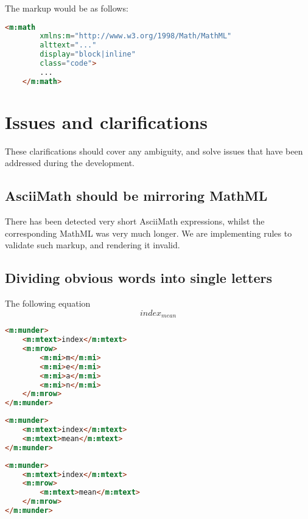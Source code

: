 \documentclass[english,a4paper,11pt]{article}
\begin{document}
\begin{eksempler}
The markup would be as follows:
\begin{lstlisting}[language=HTML]
	<m:math 
	    xmlns:m="http://www.w3.org/1998/Math/MathML"
	    alttext="..."
	    display="block|inline"
		class="code">
		...
	</m:math>
\end{lstlisting}
\end{eksempler}

\section{Issues and clarifications}

These clarifications should cover any ambiguity, and solve issues that have been addressed during the development.

\subsection{AsciiMath should be mirroring MathML}

There has been detected very short AsciiMath expressions, whilst the corresponding MathML was very much longer. We are implementing rules to validate such markup, and rendering it invalid.

\subsection{Dividing obvious words into single letters}
\begin{eksempler}
	The following equation
\begin{equation}
	index_{mean}
\end{equation}

\begin{lstlisting}[language=HTML, caption={\textbf{Invalid markup}}]
<m:munder>
	<m:mtext>index</m:mtext>
	<m:mrow>
		<m:mi>m</m:mi>
		<m:mi>e</m:mi>
		<m:mi>a</m:mi>
		<m:mi>n</m:mi>
	</m:mrow>
</m:munder>
\end{lstlisting}

\begin{lstlisting}[language=HTML, caption={Valid markup 1}]
<m:munder>
	<m:mtext>index</m:mtext>
	<m:mtext>mean</m:mtext>
</m:munder>
\end{lstlisting}

\begin{lstlisting}[language=HTML, caption={Valid markup 2}]
<m:munder>
	<m:mtext>index</m:mtext>
	<m:mrow>
		<m:mtext>mean</m:mtext>
	</m:mrow>
</m:munder>
\end{lstlisting}
\end{eksempler}
\end{document}
